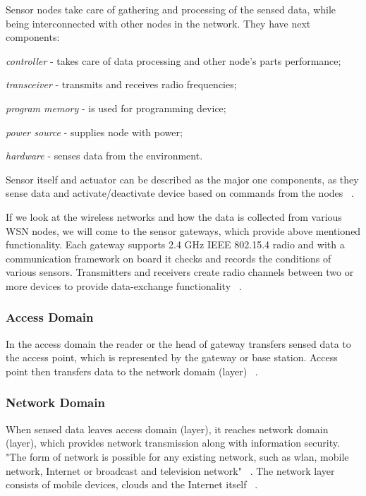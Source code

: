 \documentclass[12pt]{article}
\begin{document}
Sensor nodes take care of gathering and processing of the sensed data, while being interconnected with other nodes in the network. They have next components:
\begin{enumerate*}[label=(\roman*)]
 \item \textit{controller} - takes care of data processing and other node's parts performance; 
 \item \textit{transceiver} - transmits and receives radio frequencies; 
 \item \textit{program memory} - is used for programming device; 
 \item \textit{power source} - supplies node with power; 
 \item \textit{hardware} - senses data from the environment.
\end{enumerate*}  
 Sensor itself and actuator can be described as the major one components, as they sense data and activate/deactivate device based on commands from the nodes ~\cite{SSAIoT}.

If we look at the wireless networks and how the data is collected from various WSN nodes, we will come to the sensor gateways, which provide above mentioned functionality. Each gateway supports 2.4 GHz IEEE 802.15.4 radio and with a communication framework on board it checks and records the conditions of various sensors. Transmitters and receivers create radio channels between two or more devices to provide data-exchange functionality  ~\cite{SSAIoT}. 

  
\subsubsection{Access Domain}
In the access domain the reader or the head of gateway transfers sensed data to the access point, which is represented by the gateway or base station. Access point then transfers data to the network domain (layer) ~\cite{IoTSur}. 

\subsubsection{Network Domain}
When sensed data leaves access domain (layer), it reaches network domain (layer), which provides network transmission along with information security. "The form of network is possible for any existing network, such as wlan, mobile network, Internet or broadcast and television network" ~\cite{IoTSur}. The network layer consists of mobile devices, clouds and the Internet itself ~\cite{SSAIoT}.
\end{document}
